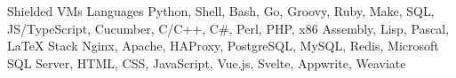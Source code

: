 \begin{cvskills}
{          Shielded VMs
        }
    \cvskill
        { Languages }
        {
          Python,
          Shell,
          Bash,
          Go,
          Groovy,
          Ruby,
          Make,
          SQL,
          JS/TypeScript,
          Cucumber,
          C/C++,
          C\#,
          Perl,
          PHP,
          x86 Assembly,
          Lisp,
          Pascal,
          LaTeX
        }
    \cvskill
        { Stack }
        {
          Nginx,
          Apache,
          HAProxy,
          PostgreSQL,
          MySQL,
          Redis,
          Microsoft SQL Server,
          HTML,
          CSS,
          JavaScript,
          Vue.js,
          Svelte,
          Appwrite,
          Weaviate
        }

\end{cvskills}
